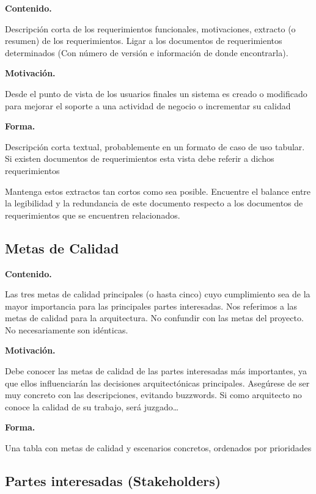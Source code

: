 \documentclass[]{article}
\begin{document}
\textbf{Contenido.}

Descripción corta de los requerimientos funcionales, motivaciones,
extracto (o resumen) de los requerimientos. Ligar a los documentos de
requerimientos determinados (Con número de versión e información de
donde encontrarla).

\textbf{Motivación.}

Desde el punto de vista de los usuarios finales un sistema es creado o
modificado para mejorar el soporte a una actividad de negocio o
incrementar su calidad

\textbf{Forma.}

Descripción corta textual, probablemente en un formato de caso de uso
tabular. Si existen documentos de requerimientos esta vista debe referir
a dichos requerimientos

Mantenga estos extractos tan cortos como sea posible. Encuentre el
balance entre la legibilidad y la redundancia de este documento respecto
a los documentos de requerimientos que se encuentren relacionados.

\hypertarget{_metas_de_calidad}{%
\subsection{Metas de Calidad}\label{_metas_de_calidad}}

\textbf{Contenido.}

Las tres metas de calidad principales (o hasta cinco) cuyo cumplimiento
sea de la mayor importancia para las principales partes interesadas. Nos
referimos a las metas de calidad para la arquitectura. No confundir con
las metas del proyecto. No necesariamente son idénticas.

\textbf{Motivación.}

Debe conocer las metas de calidad de las partes interesadas más
importantes, ya que ellos influenciarán las decisiones arquitectónicas
principales. Asegúrese de ser muy concreto con las descripciones,
evitando buzzwords. Si como arquitecto no conoce la calidad de su
trabajo, será juzgado\ldots{}

\textbf{Forma.}

Una tabla con metas de calidad y escenarios concretos, ordenados por
prioridades

\hypertarget{_partes_interesadas_stakeholders}{%
\subsection{Partes interesadas
(Stakeholders)}\label{_partes_interesadas_stakeholders}}
\end{document}
